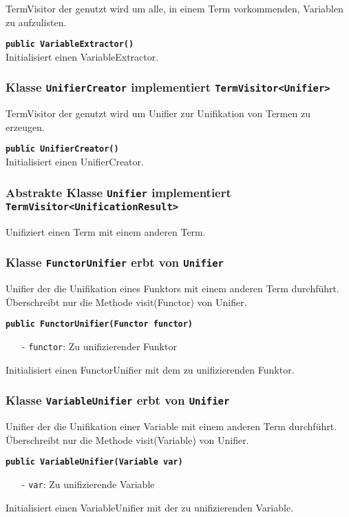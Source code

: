 \documentclass[parskip=full,11pt,twoside]{scrartcl}
\begin{document}
TermVisitor der genutzt wird um alle, in einem Term vorkommenden, Variablen zu aufzulisten.

\textbf{\texttt{public VariableExtractor()}}\\
Initialisiert einen VariableExtractor.

\subsubsection{Klasse \texttt{UnifierCreator} implementiert \texttt{TermVisitor<Unifier>}}

TermVisitor der genutzt wird um Unifier zur Unifikation von Termen zu erzeugen.

\textbf{\texttt{public UnifierCreator()}}\\
Initialisiert einen UnifierCreator.

\subsubsection{Abstrakte Klasse \texttt{Unifier} implementiert \texttt{TermVisitor<UnificationResult>}}

Unifiziert einen Term mit einem anderen Term.

\subsubsection{Klasse \texttt{FunctorUnifier} erbt von \texttt{Unifier}}
Unifier der die Unifikation eines Funktors mit einem anderen Term durchführt. Überschreibt nur die Methode visit(Functor) von Unifier.

\textbf{\texttt{public FunctorUnifier(Functor functor)}}
\begin{itemize}[noitemsep]
	\item[-] \texttt{functor}: Zu unifizierender Funktor
\end{itemize}
Initialisiert einen FunctorUnifier mit dem zu unifizierenden Funktor.

\subsubsection{Klasse \texttt{VariableUnifier} erbt von \texttt{Unifier}}
Unifier der die Unifikation einer Variable mit einem anderen Term durchführt. Überschreibt nur die Methode visit(Variable) von Unifier.

\textbf{\texttt{public VariableUnifier(Variable var)}}
\begin{itemize}[noitemsep]
	\item[-] \texttt{var}: Zu unifizierende Variable
\end{itemize}
Initialisiert einen VariableUnifier mit der zu unifizierenden Variable.
\newpage
\end{document}
